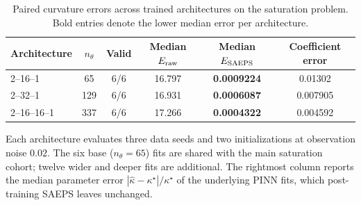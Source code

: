 \begin{table}[!htbp]
\centering
\caption{Paired curvature errors across trained architectures on the saturation problem. Bold entries denote the lower median error per architecture.}
\label{tab:architecture}
\small
\setlength{\tabcolsep}{4pt}
\begin{tabular}{l S[table-format=3.0] c S[table-format=2.4] S[table-format=1.3e-1,scientific-notation=true] S[table-format=1.6]}
\toprule
{Architecture} & {$n_\theta$} & {Valid} & {Median $E_{\rm raw}$} & {Median $E_{\rm SAEPS}$} & {Coefficient error} \\
--16--1 & 65 & 6/6 & 16.797 & \bfseries 0.0009224 & 0.01302 \\
2--32--1 & 129 & 6/6 & 16.931 & \bfseries 0.0006087 & 0.007905 \\
2--16--16--1 & 337 & 6/6 & 17.266 & \bfseries 0.0004322 & 0.004592 \\
\bottomrule
\end{tabular}
\par\vspace{3pt}\begin{minipage}{.98\linewidth}\footnotesize Each architecture evaluates three data seeds and two initializations at observation noise $0.02$. The six base ($n_\theta=65$) fits are shared with the main saturation cohort; twelve wider and deeper fits are additional. The rightmost column reports the median parameter error $|\widehat\kappa-\kappa^\star|/\kappa^\star$ of the underlying PINN fits, which post-training SAEPS leaves unchanged.\end{minipage}
\end{table}
